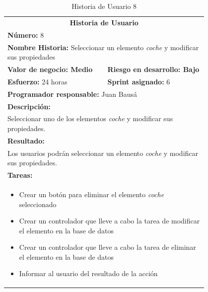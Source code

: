 	\begin{table}[H]
	  \centering 
	 	\begin{tabular}{p{0.4\linewidth}p{0.4\linewidth}}
	    \toprule
	    \multicolumn{2}{c}{\cellcolor{black!30}\textbf{Historia de Usuario}} 													\\
		\multicolumn{2}{l}{\cellcolor{gray!25}\textbf{Número: }8}																\\
		\multicolumn{2}{l}{\textbf{Nombre Historia: } Seleccionar un elemento \textit{coche} y modificar sus propiedades}							\\
		\cellcolor{gray!25}\textbf{Valor de negocio: Medio}	&	\cellcolor{gray!25}\textbf{Riesgo en desarrollo: Bajo}		\\
		\textbf{Esfuerzo:} 24 horas				&	\textbf{Sprint asignado: }6 												\\
		\multicolumn{2}{l}{\cellcolor{gray!25}\textbf{Programador responsable: }Juan Bausá}									\\
		\multicolumn{2}{l}{\textbf{Descripción:}}                                                     						\\
		\multicolumn{2}{l}{\parbox{15cm}{Seleccionar uno de los elementos \textit{coche} y modificar sus propiedades.}}				\\
		\multicolumn{2}{l}{\cellcolor{gray!25}\textbf{Resultado:}}																\\		
		\multicolumn{2}{l}{\parbox{15cm}{Los usuarios podrán seleccionar un elemento \textit{coche} y modificar sus propiedades.}}																								\\
		\multicolumn{2}{l}{\textbf{Tareas:}}																					\\
		\multicolumn{2}{l}{
			\begin{minipage}{12cm}
	    		\vskip 4pt
	    		\begin{itemize}
	    			\item Crear un botón para eliminar el elemento \textit{coche} seleccionado
	    			\item Crear un controlador que lleve a cabo la tarea de modificar el elemento en la base de datos
	     			\item Crear un controlador que lleve a cabo la tarea de eliminar el elemento en la base de datos
	    			\item Informar al usuario del resultado de la acción
				\end{itemize}
			  	\vskip 4pt
		 	\end{minipage}
		} \\																				
	    \hline
	  \end{tabular}
	  \caption{Historia de Usuario 8}
	\end{table}
	
